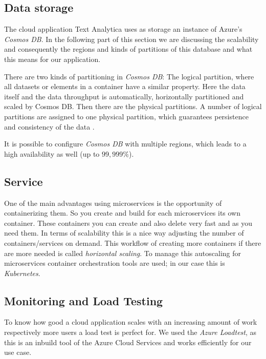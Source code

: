 \documentclass[conference]{IEEEtran}
\begin{document}
\subsection{Data storage}
The cloud application Text Analytica uses as storage an instance of Azure's \textit{Cosmos DB}. In the following part of this section we are discussing the scalability and consequently the regions and kinds of partitions of this database and what this means for our application.

There are two kinds of partitioning in \textit{Cosmos DB}: The logical partition, where all datasets or elements in a container have a similar property. Here the data itself and the data throughput is automatically, horizontally partitioned and scaled by Cosmos DB. Then there are the physical partitions. A number of logical partitions are assigned to one physical partition, which guarantees persistence and consistency of the data \cite{CosmosDBHorScal}.

It is possible to configure \textit{Cosmos DB} with multiple regions, which leads to a high availability as well (up to $99,999\%$)\cite{CosmosDBHA}.

\subsection{Service}
One of the main advantages using microservices is the opportunity of containerizing them. So you create and build for each microservices its own container. These containers you can create and also delete very fast and as you need them.
In terms of scalability this is a nice way adjusting the number of containers/services on demand.
This workflow of creating more containers if there are more needed is called \textit{horizontal scaling}. To manage this autoscaling for microservices container orchestration tools are used; in our case this is \textit{Kubernetes}.
\cite{GuideContainerClusters}
\cite{KubernetesScaling}
\cite{KubernetesAutoscaler}

\subsection{Monitoring and Load Testing}
To know how good a cloud application scales with an increasing amount of work respectively more users a load test is perfect for. We used the \textit{Azure Loadtest}, as this is an inbuild tool of the Azure Cloud Services and works efficiently for our use case.
\end{document}
